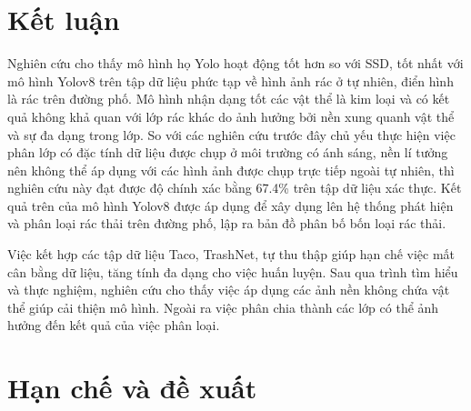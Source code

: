 \documentclass[../the.tex]{subfiles}
\begin{document}
\section{Kết luận}

{\fontsize{13}{12} \selectfont
Nghiên cứu cho thấy mô hình họ Yolo hoạt động tốt hơn so với SSD, tốt nhất với mô hình Yolov8 trên tập dữ liệu phức tạp về hình ảnh rác ở tự nhiên, điển hình là rác trên đường phố.
Mô hình nhận dạng tốt các vật thể là kim loại và có kết quả không khả quan với lớp rác khác do ảnh hưởng bởi nền xung quanh vật thể và sự đa dạng trong lớp.
So với các nghiên cứu trước đây chủ yếu thực hiện việc phân lớp có đặc tính dữ liệu được chụp ở môi trường có ánh sáng, nền lí tưởng nên không thể áp dụng với các hình ảnh được chụp trực tiếp ngoài tự nhiên, thì nghiên cứu này đạt được độ chính xác bằng 67.4\% trên tập dữ liệu xác thực.
Kết quả trên của mô hình Yolov8 được áp dụng để xây dụng lên hệ thống phát hiện và phân loại rác thải trên đường phố, lập ra bản đồ phân bố bốn loại rác thải.
\selectfont }

\bigskip

{\fontsize{13}{12} \selectfont 
Việc kết hợp các tập dữ liệu Taco, TrashNet, tự thu thập giúp hạn chế việc mất cân bằng dữ liệu, tăng tính đa dạng cho việc huấn luyện.
Sau qua trình tìm hiểu và thực nghiệm, nghiên cứu cho thấy việc áp dụng các ảnh nền không chứa vật thể giúp cải thiện mô hình. Ngoài ra việc phân chia thành các lớp có thể ảnh hưởng đến kết quả của việc phân loại.
}
\section{Hạn chế và đề xuất}
\end{document}
